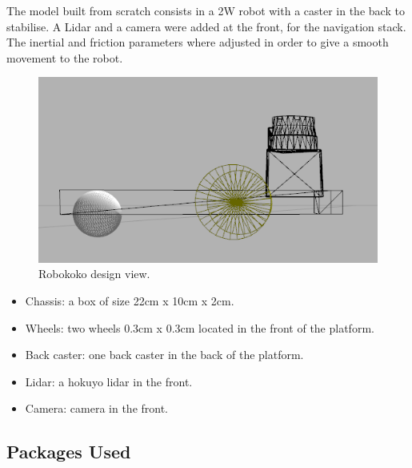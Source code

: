 \documentclass[10pt,journal,compsoc]{IEEEtran}
\begin{document}
The model built from scratch consists in a 2W robot with a caster in the back to stabilise. A Lidar and a camera were added at the front, for the navigation stack. The inertial and friction parameters where adjusted in order to give a smooth movement to the robot.

\begin{figure}[h]
\centering
\includegraphics[scale=0.3]{robokoko-design-2}
\caption{Robokoko design view.}
\label{fig:mesh2}
\end{figure}

\begin{itemize}
\item Chassis: a box of size 22cm x 10cm x 2cm.
\item Wheels: two wheels 0.3cm x 0.3cm located in the front of the platform.
\item Back caster: one back caster in the back of the platform.
\item Lidar: a hokuyo lidar in the front.
\item Camera: camera in the front.
\end{itemize}

\subsection{Packages Used}
\end{document}
